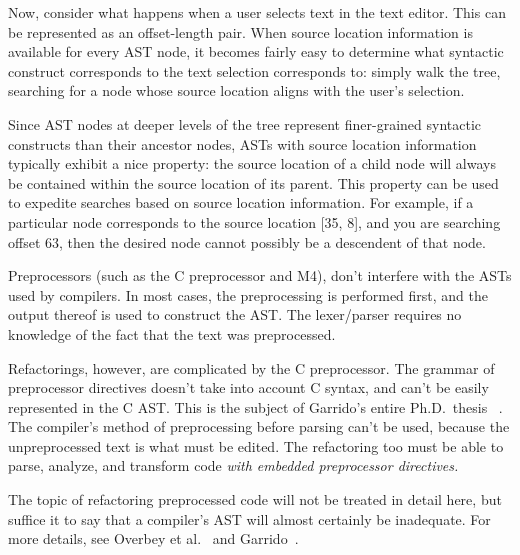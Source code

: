 \documentclass[prodmode]{acmlarge}
\begin{document}
Now, consider what happens when a user selects text in the text editor.  This
can be represented as an offset-length pair.  When source location information
is available for every AST node, it becomes fairly easy to determine what
syntactic construct corresponds to the text selection corresponds to: simply
walk the tree, searching for a node whose source location aligns with the
user's selection.

Since AST nodes at deeper levels of the tree represent finer-grained syntactic
constructs than their ancestor nodes, ASTs with source location information
typically exhibit a nice property: the source location of a child node will
always be contained within the source location of its parent.  This property
can be used to expedite searches based on source location information.  For
example, if a particular node corresponds to the source location [35, 8], and
you are searching offset 63, then the desired node cannot possibly be a
descendent of that node.

Preprocessors (such as the C preprocessor and M4), don't interfere with the ASTs
used by compilers. In most cases, the preprocessing is performed first, and the
output thereof is used to construct the AST. The lexer/parser requires no 
knowledge of the fact that the text was preprocessed.

Refactorings, however, are complicated by the C preprocessor. The grammar of 
preprocessor directives doesn't take into account C syntax, and can't be easily
represented in the C AST. This is the subject of Garrido's entire Ph.D.~thesis~%
\cite{garrido05program}. The compiler's method of preprocessing before parsing
can't be used, because the unpreprocessed text is what must be edited. The 
refactoring too must be able to parse, analyze, and transform code \textit{
with embedded preprocessor directives.}

The topic of refactoring preprocessed code will not be treated in detail here,
but suffice it to say that a compiler's AST will almost certainly be inadequate.
For more details, see Overbey et al.~\cite{wrt2009} and 
Garrido~\cite{garrido05program}.
\end{document}
